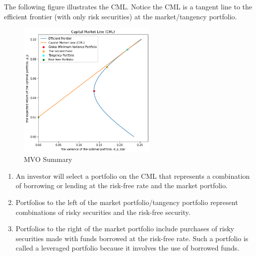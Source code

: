 \documentclass[13pt]{article}
\theoremstyle{definition}
\theoremstyle{remark}
\newenvironment{remark}
  {\pushQED{\qed}\renewcommand{\qedsymbol}{$\triangle$}\remarkx}
  {\popQED\endremarkx}
\begin{document}
The following figure illustrates the CML. Notice the CML is a tangent line to the efficient frontier (with only risk securities) at the market/tangency portfolio.
\begin{figure}[!htp]
    \centering
    \includegraphics[width=0.6\textwidth]{All in One.png}
    \caption{MVO Summary}
    \label{fig:MVO Summary}
\end{figure}
\begin{remark}
    \hfill
    \begin{enumerate}
        \item An investor will select a portfolio on the CML that represents a combination of borrowing or lending at the risk-free rate and the market portfolio.
        \item Portfolios to the left of the market portfolio/tangency portfolio represent combinations of risky securities and the risk-free security.
        \item Portfolios to the right of the market portfolio include purchases of risky securities made with funds borrowed at the risk-free rate. Such a portfolio is called a leveraged portfolio because it involves the use of borrowed funds.
    \end{enumerate}
\end{remark}
\end{document}

